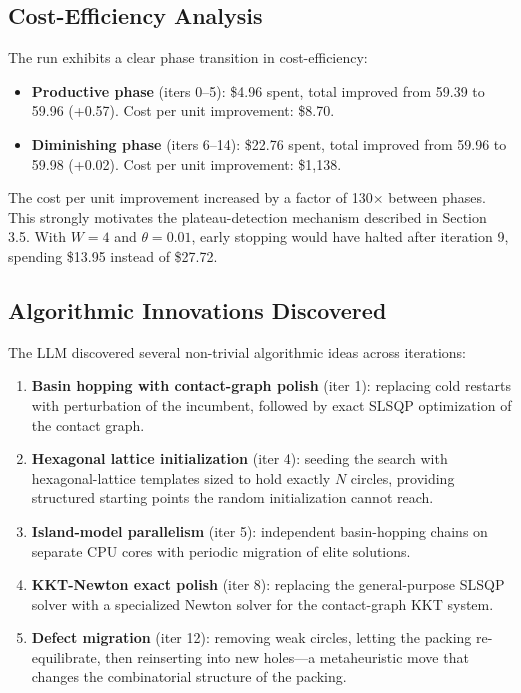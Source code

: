 \documentclass[11pt]{article}
\begin{document}
\subsection{Cost-Efficiency Analysis}

The run exhibits a clear phase transition in cost-efficiency:

\begin{itemize}
  \item \textbf{Productive phase} (iters 0--5): \$4.96 spent, total improved from 59.39 to
        59.96 (+0.57). Cost per unit improvement: \$8.70.
  \item \textbf{Diminishing phase} (iters 6--14): \$22.76 spent, total improved from 59.96
        to 59.98 (+0.02). Cost per unit improvement: \$1,138.
\end{itemize}

The cost per unit improvement increased by a factor of 130$\times$ between phases. This
strongly motivates the plateau-detection mechanism described in Section 3.5. With $W=4$ and
$\theta=0.01$, early stopping would have halted after iteration 9, spending \$13.95 instead
of \$27.72.

\subsection{Algorithmic Innovations Discovered}

The LLM discovered several non-trivial algorithmic ideas across iterations:

\begin{enumerate}
  \item \textbf{Basin hopping with contact-graph polish} (iter 1): replacing cold restarts
        with perturbation of the incumbent, followed by exact SLSQP optimization of the
        contact graph.
  \item \textbf{Hexagonal lattice initialization} (iter 4): seeding the search with
        hexagonal-lattice templates sized to hold exactly $N$ circles, providing structured
        starting points the random initialization cannot reach.
  \item \textbf{Island-model parallelism} (iter 5): independent basin-hopping chains on
        separate CPU cores with periodic migration of elite solutions.
  \item \textbf{KKT-Newton exact polish} (iter 8): replacing the general-purpose SLSQP
        solver with a specialized Newton solver for the contact-graph KKT system.
  \item \textbf{Defect migration} (iter 12): removing weak circles, letting the packing
        re-equilibrate, then reinserting into new holes---a metaheuristic move that changes
        the combinatorial structure of the packing.
\end{enumerate}
\end{document}
